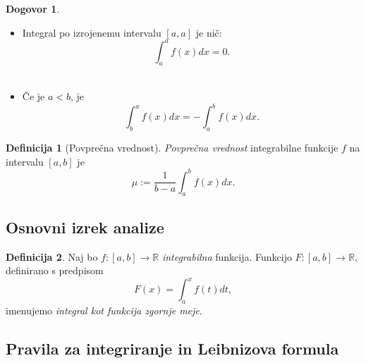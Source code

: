 \documentclass[11pt]{article}
\theoremstyle{definition}
\newtheorem{definicija}{Definicija}[section]
\newtheorem*{dogovor}{Dogovor}
\begin{document}
\begin{dogovor}
	\begin{itemize}
		\item Integral po izrojenemu intervalu $[a, a]$ je nič: 
		$$\int_{a}^{a} f(x) dx = 0.$$ \\
		\item Če je $a < b$, je 
		$$\int_{b}^{a} f(x) dx = - \int_{a}^{b} f(x) dx.$$
	\end{itemize}
\end{dogovor}
\vspace{0.5cm}

\begin{definicija}[Povprečna vrednost]

\textit{Povprečna vrednost} integrabilne funkcije $f$ na intervalu $[a, b]$ je 
$$\mu := \frac{1}{b-a} \int_{a}^{b} f(x) dx.$$

\end{definicija}
\vspace{0.5cm}


\subsection{Osnovni izrek analize}
\vspace{0.5cm}

\begin{definicija}

Naj bo $f:[a, b] \rightarrow \mathbb{R}$ \textit{integrabilna} funkcija. Funkcijo $F:[a, b] \rightarrow \mathbb{R}$, definirano s predpisom
$$F(x) = \int_{a}^{x} f(t) dt,$$
imenujemo \textit{integral kot funkcija zgornje meje}.

\end{definicija}
\vspace{0.5cm}


\subsection{Pravila za integriranje in Leibnizova formula}
\vspace{0.5cm}

\end{document}
